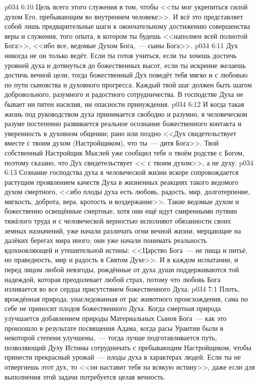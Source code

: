 \vs p034 6:10 Цель всего этого служения в том, чтобы <<ты мог укрепиться силой духом Его, пребывающим во внутреннем человеке>>. И всё это представляет собой лишь предварительные шаги к окончательному достижению совершенства веры и служения, того опыта, в котором ты будешь <<наполнен всей полнотой Бога>>, <<ибо все, ведомые Духом Бога,~--- сыны Бога>>.
\vs p034 6:11 \pc Дух никогда не  он только ведёт. Если ты готов учиться, если ты хочешь достичь уровней духа и дотянуться до божественных высот, если ты искренне желаешь достичь вечной цели, тогда божественный Дух поведёт тебя мягко и с любовью по пути сыновства и духовного прогресса. Каждый твой шаг должен быть шагом добровольного, разумного и радостного сотрудничества. В господстве Духа не бывает ни пятен насилия, ни опасности принуждения.
\vs p034 6:12 И когда такая жизнь под руководством духа принимается свободно и разумно, в человеческом разуме постепенно развивается реальное осознание божественного контакта и уверенность в духовном общении; рано или поздно <<Дух свидетельствует вместе с твоим духом (Настройщиком), что ты~--- дитя Бога>>. Твой собственный Настройщик Мыслей уже сообщил тебе о твоём родстве с Богом, поэтому сказано, что Дух свидетельствует << с твоим духом>>, а не  духу.
\vs p034 6:13 Сознание господства духа в человеческой жизни вскоре сопровождается растущим проявлением качеств Духа в жизненных реакциях такого ведомого духом смертного, <<ибо плоды духа есть любовь, радость, мир, долготерпение, мягкость, доброта, вера, кротость и воздержание>>. Такие ведомые духом и божественно освещённые смертные, хотя они ещё идут смиренными путями тяжёлого труда и с человеческой верностью исполняют обязанности своих земных назначений, уже начали различать огни вечной жизни, мерцающие на далёких берегах мира иного; они уже начали понимать реальность вдохновляющей и утешительной истины: <<Царство Бога~--- не пища и питьё, но праведность, мир и радость в Святом Духе>>. И в каждом испытании, и перед лицом любой невзгоды, рождённые от духа души поддерживаются той надеждой, которая преодолевает любой страх, потому что любовь Бога изливается во все сердца присутствием божественного Духа.
\vs p034 7:1 Плоть, врождённая природа, унаследованная от рас животного происхождения, сама по себе не приносит плодов божественного Духа. Когда смертная природа улучшается добавлением природы Материальных Сынов Бога~--- как это произошло в результате посвящения Адама, когда расы Урантии были в некоторой степени улучшены,~--- тогда лучше подготавливается путь, позволяющий Духу Истины сотрудничать с пребывающим Настройщиком, чтобы принести прекрасный урожай~--- плоды духа в характерах людей. Если ты не отвергнешь этот дух, то <<он наставит тебя на всякую истину>>, даже если для выполнения этой задачи потребуется целая вечность.
